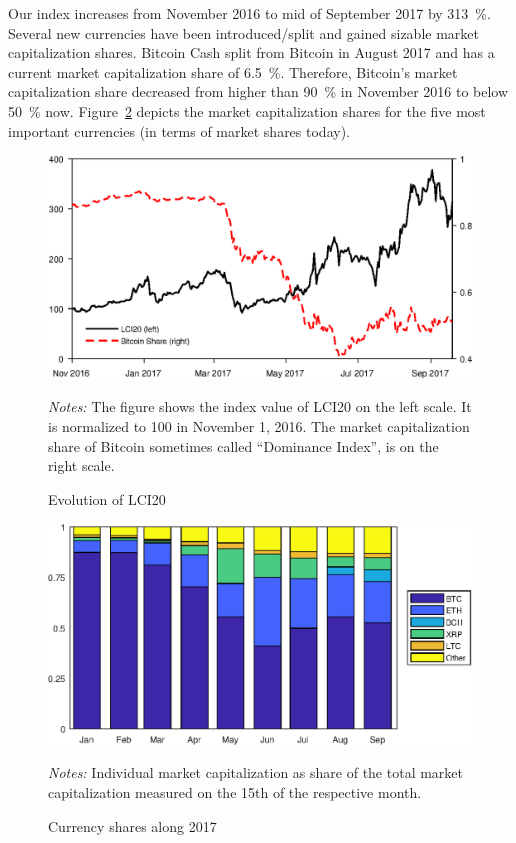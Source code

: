 \documentclass[11pt]{article}
\newcommand\fnotes[1]{\captionsetup{font=scriptsize}\caption*{\textsl{Notes:} #1}}
\begin{document}
Our index increases from November 2016 to mid of September 2017 by 313~\%.
Several new currencies have been introduced/split and gained sizable market capitalization shares.
Bitcoin Cash split from Bitcoin in August 2017 and has a current market capitalization share of 6.5~\%.
Therefore, Bitcoin's market capitalization share decreased from higher than 90~\% in November 2016 to below 50~\% now.
Figure~\ref{f:curshares} depicts the market capitalization shares for the five most important currencies (in terms of market shares today).

\begin{figure}[h]%
    \centering%
    \caption{Evolution of LCI20}\label{f:lci20}%
    \includegraphics[width=\textwidth]{figs/lci20.eps}%
    \medskip\newline%
    \fnotes{The figure shows the index value of LCI20 on the left scale. It is normalized to 100 in November 1, 2016. The market capitalization share of Bitcoin sometimes called ``Dominance Index'', is on the right scale.}
\end{figure}

\begin{figure}[h]%
    \centering%
    \caption{Currency shares along 2017}\label{f:curshares}%
    \includegraphics[width=\textwidth]{figs/currency_shares.eps}%
    \medskip\newline%
    \fnotes{Individual market capitalization as share of the total market capitalization measured on the 15th of the respective month.}
\end{figure}
\end{document}
